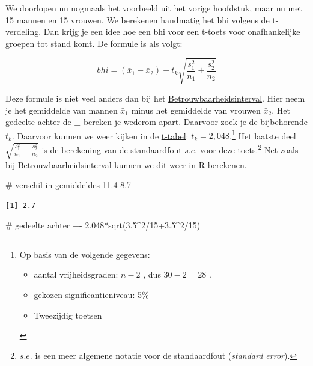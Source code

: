 \documentclass[
  letterpaper,
  DIV=11,
  numbers=noendperiod]{scrreprt}
\newenvironment{Shaded}{\begin{snugshade}}{\end{snugshade}}
\newcommand{\CommentTok}[1]{\textcolor[rgb]{0.37,0.37,0.37}{#1}}
\newcommand{\DecValTok}[1]{\textcolor[rgb]{0.68,0.00,0.00}{#1}}
\newcommand{\FloatTok}[1]{\textcolor[rgb]{0.68,0.00,0.00}{#1}}
\newcommand{\FunctionTok}[1]{\textcolor[rgb]{0.28,0.35,0.67}{#1}}
\newcommand{\NormalTok}[1]{\textcolor[rgb]{0.00,0.23,0.31}{#1}}
\newcommand{\SpecialCharTok}[1]{\textcolor[rgb]{0.37,0.37,0.37}{#1}}
\providecommand{\tightlist}{%
  \setlength{\itemsep}{0pt}\setlength{\parskip}{0pt}}
\begin{document}
We doorlopen nu nogmaals het voorbeeld uit het vorige hoofdstuk, maar nu
met 15 mannen en 15 vrouwen. We berekenen handmatig het bhi volgens de
t-verdeling. Dan krijg je een idee hoe een bhi voor een t-toets voor
onafhankelijke groepen tot stand komt. De formule is als volgt:

\[
bhi =(\bar{x}_1 - \bar{x}_2) \pm t_k \sqrt{\frac{s_1^2}{n_1} + \frac{s_2^2}{n_2}}
\]

Deze formule is niet veel anders dan bij het
\hyperref[betrouwbaarheidsinterval]{Betrouwbaarheidsinterval}. Hier neem
je het gemiddelde van mannen \(\bar{x}_1\) minus het gemiddelde van
vrouwen \(\bar{x}_2\). Het gedeelte achter de \(\pm\) bereken je wederom
apart. Daarvoor zoek je de bijbehorende \(t_k\). Daarvoor kunnen we weer
kijken in de
\href{https://statisticsfundamentals.com/tables/t-distribution-table/}{t-tabel}:
\(t_k=2,048\).\footnote{Op basis van de volgende gegevens:

  \begin{itemize}
  \tightlist
  \item
    aantal vrijheidsgraden: \(n-2\) , dus \(30-2=28\) .
  \item
    gekozen significantieniveau: 5\%
  \item
    Tweezijdig toetsen
  \end{itemize}} Het laatste deel
\(\sqrt{\frac{s_1^2}{n_1} + \frac{s_2^2}{n_2}}\) is de berekening van de
standaardfout \(s.e.\) voor deze toets.\footnote{\(s.e.\) is een meer
  algemene notatie voor de standaardfout (\emph{standard error}).} Net
zoals bij \hyperref[betrouwbaarheidsinterval]{Betrouwbaarheidsinterval}
kunnen we dit weer in R berekenen.

\begin{Shaded}
\begin{Highlighting}[]
\CommentTok{\# verschil in gemiddeldes}
\FloatTok{11.4{-}8.7}
\end{Highlighting}
\end{Shaded}

\begin{verbatim}
[1] 2.7
\end{verbatim}

\begin{Shaded}
\begin{Highlighting}[]
\CommentTok{\# gedeelte achter +{-}}
\FloatTok{2.048}\SpecialCharTok{*}\FunctionTok{sqrt}\NormalTok{(}\FloatTok{3.5}\SpecialCharTok{\^{}}\DecValTok{2}\SpecialCharTok{/}\DecValTok{15}\FloatTok{+3.5}\SpecialCharTok{\^{}}\DecValTok{2}\SpecialCharTok{/}\DecValTok{15}\NormalTok{)}
\end{Highlighting}
\end{Shaded}
\end{document}
